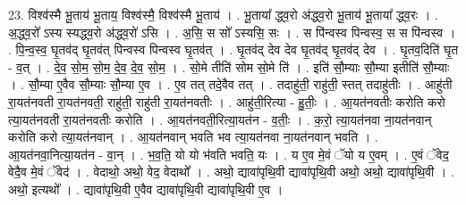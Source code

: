 \documentclass[17pt]{extarticle}
\begin{document}
23. विश्व॑स्मै भू॒ताय॑ भू॒ताय॒ विश्व॑स्मै॒ विश्व॑स्मै भू॒ताय॑ । . भू॒ताया᳚ द्ध्व॒रो अ॑द्ध्व॒रो भू॒ताय॑ भू॒ताया᳚ द्ध्व॒रः । . अ॒द्ध्व॒रो᳚ ऽस्य स्यद्ध्व॒रो अ॑द्ध्व॒रो॑ ऽसि । . अ॒सि॒ स सो᳚ ऽस्यसि॒ सः । . स पि॑न्वस्व पिन्वस्व॒ स स पि॑न्वस्व । . पि॒न्व॒स्व॒ घृ॒तव॑द् घृ॒तव॑त् पिन्वस्व पिन्वस्व घृ॒तव॑त् । . घृ॒तव॑द् देव देव घृ॒तव॑द् घृ॒तव॑द् देव । . घृ॒तव॒दिति॑ घृ॒त - व॒त् । . दे॒व॒ सो॒म॒ सो॒म॒ दे॒व॒ दे॒व॒ सो॒म॒ । . सो॒मे तीति॑ सोम सो॒मे ति॑ । . इति॑ सौ॒म्याः सौ॒म्या इतीति॑ सौ॒म्याः । . सौ॒म्या ए॒वैव सौ॒म्याः सौ॒म्या ए॒व । . ए॒व तत् तदे॒वैव तत् । . तदाहु॑ती॒ राहु॑ती॒ स्तत् तदाहु॑तीः । . आहु॑ती रा॒यत॑नवती रा॒यत॑नवती॒ राहु॑ती॒ राहु॑ती रा॒यत॑नवतीः । . आहु॑ती॒रित्या - हु॒तीः॒ । . आ॒यत॑नवतीः करोति करो त्या॒यत॑नवती रा॒यत॑नवतीः करोति । . आ॒यत॑नवती॒रित्या॒यत॑न - व॒तीः॒ । . क॒रो॒ त्या॒यत॑नवा ना॒यत॑नवान् करोति करो त्या॒यत॑नवान् । . आ॒यत॑नवान् भवति भव त्या॒यत॑नवा ना॒यत॑नवान् भवति । . आ॒यत॑नवा॒नित्या॒यत॑न - वा॒न् । . भ॒व॒ति॒ यो यो भ॑वति भवति॒ यः । . य ए॒व मे॒वं ॅयो य ए॒वम् । . ए॒वं ॅवेद॒ वेदै॒व मे॒वं ॅवेद॑ । . वेदाथो॒ अथो॒ वेद॒ वेदाथो᳚ । . अथो॒ द्यावा॑पृथि॒वी द्यावा॑पृथि॒वी अथो॒ अथो॒ द्यावा॑पृथि॒वी । . अथो॒ इत्यथो᳚ । . द्यावा॑पृथि॒वी ए॒वैव द्यावा॑पृथि॒वी द्यावा॑पृथि॒वी ए॒व । \newline
\end{document}
